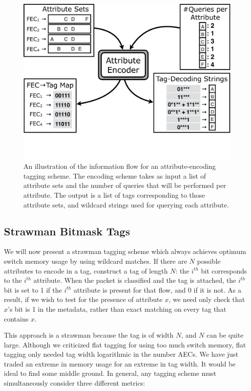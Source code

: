 \begin{figure}[t!] 
\begin{minipage}{1\linewidth}
\includegraphics[trim={0 4cm 0 0}, clip, width=\linewidth]{figures/system_flow2}
\end{minipage} 
\caption{An illustration of the information flow for an attribute-encoding tagging scheme. The encoding scheme takes as input a list of attribute sets and the number of queries that will be performed per attribute. The output is a list of tags corresponding to those attribute sets, and wildcard strings used for querying each attribute.}
\label{fig:system_flow}
\end{figure}


\subsection{Strawman Bitmask Tags}

We will now present a strawman tagging scheme which always achieves optimum switch memory usage by using wildcard matches.
If there are $N$ possible attributes to encode in a tag, construct a tag of length $N$: 
the $i^{th}$ bit corresponds to the $i^{th}$ attribute. When the packet is classified
and the tag is attached, the $i^{th}$ bit is set to 1 if the $i^{th}$ attribute
is present for that flow, and 0 if it is not. As a result, if we wish to test for
the presence of attribute $x$, we need only check that $x$'s bit is 1 in the
metadata, rather than exact matching on every tag that contains
$x$.

This approach is a strawman because the tag is of width $N$, and $N$ can be quite large.
Although we criticized flat tagging for using too much switch memory, 
flat tagging only needed tag width logarithmic in the number AECs. We have just traded an extreme in memory
usage for an extreme in tag width. It would be ideal to find some middle ground.
In general, any tagging scheme must simultaneously consider three different metrics:


